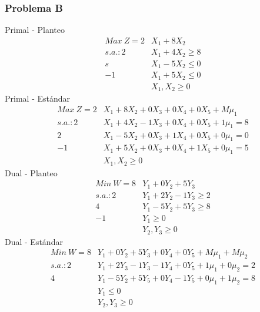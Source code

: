 \begin{homeworkProblem}
\subsubsection{Problema B}
Primal - Planteo
\begin{align*}
Max\ Z = 2&X_1 + 8X_2 \\
s.a.:2&X_1 + 4X_2 \ge 8\\
s&X_1 - 5X_2 \le 0 \\
-1&X_1 + 5X_2 \le 0 \\
&X_1,X_2 \ge 0
\end{align*}
Primal - Estándar
\begin{align*}
Max\ Z = 2&X_1 + 8X_2 + 0X_3 + 0X_4 + 0X_5 + M\mu_1 \\
s.a.: 2&X_1 + 4X_2 -1X_3 + 0X_4 + 0X_5 + 1\mu_1 = 8\\
2&X_1 - 5X_2 + 0X_3 + 1X_4 + 0X_5 + 0\mu_1 = 0 \\
-1&X_1 + 5X_2 + 0X_3 + 0X_4 + 1X_5 + 0\mu_1 = 5 \\
&X_1, X_2 \ge 0
\end{align*}
Dual - Planteo
\begin{align*}
Min\ W = 8&Y_1 + 0Y_2 + 5Y_3 \\
s.a.:2&Y_1 + 2Y_2 - 1Y_3 \ge 2 \\
4&Y_1 - 5Y_2 + 5Y_3 \ge 8 \\
-1&Y_1 \ge 0 \\
&Y_2,Y_3 \ge 0
\end{align*}
Dual - Estándar
\begin{align*}
Min\ W = 8&Y_1 + 0Y_2 + 5Y_3 + 0Y_4 + 0Y_5 + M\mu_1 + M\mu_2 \\
s.a.: 2&Y_1 + 2Y_3 - 1Y_3 - 1Y_4 + 0Y_5 + 1\mu_1 + 0\mu_2 = 2 \\
      4&Y_1 - 5Y_2 + 5Y_5 + 0Y_4 - 1Y_5 + 0\mu_1 + 1\mu_2 = 8 \\
      &Y_1 \le 0 \\ &Y_2,Y_3 \ge 0 
\end{align*}


\end{homeworkProblem}
